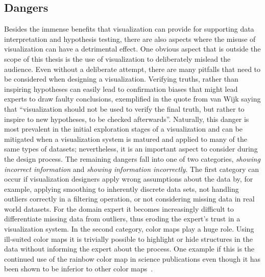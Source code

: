 \subsection{Dangers} \label{cha:intro:vis:dangers}
Besides the immense benefits that visualization can provide for supporting data interpretation and hypothesis testing, there are also aspects where the misuse of visualization can have a detrimental effect.  One obvious aspect that is outside the scope of this thesis is the use of visualization to deliberately mislead the audience.  Even without a deliberate attempt, there are many pitfalls that need to be considered when designing a visualization.  Verifying truths, rather than inspiring hypotheses can easily lead to confirmation biases that might lead experts to draw faulty conclusions, exemplified in the quote from van Wijk saying that ``visualization should not be used to verify the final truth, but rather to inspire to new hypotheses, to be checked afterwards''.  Naturally, this danger is most prevalent in the initial exploration stages of a visualization and can be mitigated when a visualization system is matured and applied to many of the same types of datasets; nevertheless, it is an important aspect to consider during the design process.  The remaining dangers fall into one of two categories, \emph{showing incorrect information} and \emph{showing information incorrectly}.  The first category can occur if visualization designers apply wrong assumptions about the data by, for example, applying smoothing to inherently discrete data sets, not handling outliers correctly in a filtering operation, or not considering missing data in real world datasets.  For the domain expert it becomes increasingly difficult to differentiate missing data from outliers, thus eroding the expert's trust in a visualization system.  In the second category, color maps play a huge role.  Using ill-suited color maps it is trivially possible to highlight or hide structures in the data without informing the expert about the process.  One example if this is the continued use of the rainbow color map in science publications even though it has been shown to be inferior to other color maps~\cite{borland2007rainbow}.



